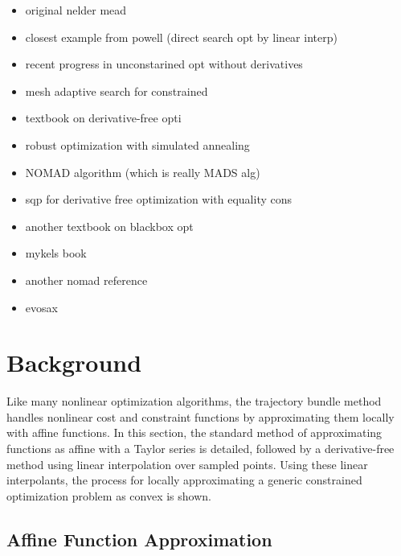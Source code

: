 \begin{itemize}
    \item original nelder mead \cite{nelder1965}
    \item closest example from powell (direct search opt by linear interp) \cite{powell1994}
    \item recent progress in unconstarined opt without derivatives \cite{conn1997}
    \item mesh adaptive search for constrained \cite{audet2006}
    \item textbook on derivative-free opti \cite{conn2009}
    \item robust optimization with simulated annealing \cite{bertsimas2010}
    \item NOMAD algorithm (which is really MADS alg) \cite{ledigabel2011}
    \item sqp for derivative free optimization with equality cons \cite{troltzsch2016}
    \item another textbook on blackbox opt \cite{audet2017}
    \item mykels book \cite{kochenderfer2019}
    \item another nomad reference \cite{audet2021}
    \item evosax \cite{lange2022}
\end{itemize}




\section{Background}\label{sec:bundles:background}
Like many nonlinear optimization algorithms, the trajectory bundle method handles nonlinear cost and constraint functions by approximating them locally with affine functions. In this section, the standard method of approximating functions as affine with a Taylor series is detailed, followed by a derivative-free method using linear interpolation over sampled points.  Using these linear interpolants, the process for locally approximating a generic constrained optimization problem as convex is shown. 
%
%
\subsection{Affine Function Approximation}
%
%



